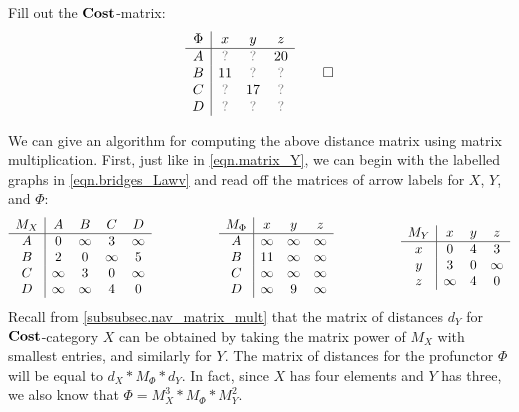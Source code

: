 \documentclass[7Sketches]{subfiles}
\begin{document}
\begin{exercise}%
\label{exc.distance_matrix_Phi}
Fill out the $\mathbf{Cost}$-matrix:
\[
\begin{array}{c|ccc}
  \Phi&x&y&z\\\hline
  A&\?&\?&20\\
  B&11&\?&\?\\
  C&\?&17&\?\\
  D&\?&\?&\?
\end{array}
\qedhere
\]
\end{exercise}

\begin{remark}
We can give an algorithm for computing the above distance matrix using matrix
multiplication. First, just like in \cref{eqn.matrix_Y}, we can begin with
the labelled graphs in \cref{eqn.bridges_Lawv} and read off the matrices of
arrow labels for $X$, $Y$, and $\Phi$:
\[
\begin{array}{c|cccc}
  M_X&A&B&C&D\\\hline
	A & 0 &\infty&3&\infty\\
	B & 2 & 0 & \infty & 5\\
	C & \infty & 3 & 0 &\infty\\
	D & \infty & \infty & 4 & 0
\end{array}
\hspace{.7in}
\begin{array}{c|ccc}
  M_\Phi&x&y&z\\\hline
  A&\infty&\infty&\infty\\
  B&11&\infty&\infty\\
  C&\infty&\infty&\infty\\
  D&\infty&9&\infty
\end{array}
\hspace{.7in}
\begin{array}{c|ccc}
  M_Y&x&y&z\\\hline
  x&0&4&3\\
  y&3&0&\infty\\
  z&\infty&4&0\\
\end{array}
\]
Recall from \cref{subsubsec.nav_matrix_mult} that the matrix of distances $d_Y$ for
$\mathbf{Cost}$-category $X$ can be obtained by taking the matrix power of $M_X$ with
smallest entries, and similarly for $Y$. The matrix of distances for the profunctor
$\Phi$ will be equal to $d_X*M_\Phi*d_Y$. In fact, since $X$ has four elements
and $Y$ has three, we also know that $\Phi= M_X^3*M_\Phi*M_Y^2$.
\end{remark}
\end{document}
